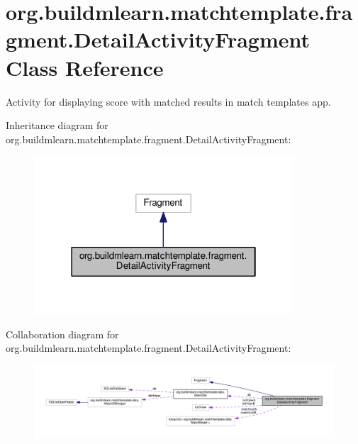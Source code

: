 \hypertarget{classorg_1_1buildmlearn_1_1matchtemplate_1_1fragment_1_1DetailActivityFragment}{}\section{org.\+buildmlearn.\+matchtemplate.\+fragment.\+Detail\+Activity\+Fragment Class Reference}
\label{classorg_1_1buildmlearn_1_1matchtemplate_1_1fragment_1_1DetailActivityFragment}


Activity for displaying score with matched results in match template\textquotesingle{}s app.  




Inheritance diagram for org.\+buildmlearn.\+matchtemplate.\+fragment.\+Detail\+Activity\+Fragment\+:
\nopagebreak
\begin{figure}[H]
\begin{center}
\leavevmode
\includegraphics[width=274pt]{classorg_1_1buildmlearn_1_1matchtemplate_1_1fragment_1_1DetailActivityFragment__inherit__graph}
\end{center}
\end{figure}


Collaboration diagram for org.\+buildmlearn.\+matchtemplate.\+fragment.\+Detail\+Activity\+Fragment\+:
\nopagebreak
\begin{figure}[H]
\begin{center}
\leavevmode
\includegraphics[width=350pt]{classorg_1_1buildmlearn_1_1matchtemplate_1_1fragment_1_1DetailActivityFragment__coll__graph}
\end{center}
\end{figure}
